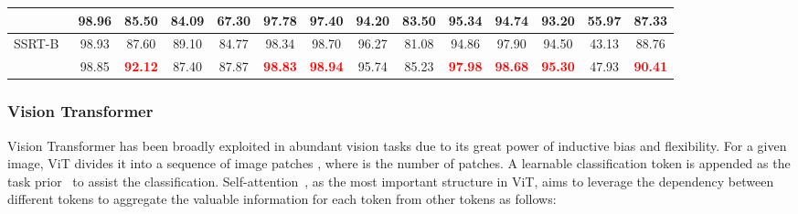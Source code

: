 \documentclass[journal]{IEEEtran}
\begin{document}
\begin{table*}[htp]
{\begin{tabular}{cccccccccccccc}
\rowcolor[gray]{0.9} \multicolumn{1}{c}{+Ours} & \multicolumn{1}{c}{98.96} & \multicolumn{1}{c}{85.50}                  & \multicolumn{1}{c}{84.09} & \multicolumn{1}{c}{67.30}                  & \multicolumn{1}{c}{97.78}                  & \multicolumn{1}{c}{97.40}                  & \multicolumn{1}{c}{94.20} & \multicolumn{1}{c}{83.50}                  & \multicolumn{1}{c}{95.34}                  & \multicolumn{1}{c}{94.74}                  & \multicolumn{1}{c}{93.20}                 & \multicolumn{1}{c}{55.97}                  & \multicolumn{1}{c}{87.33}                  \\ \hline







SSRT-B~\cite{sun2022safeSSRT}                              & 98.93                & 87.60                                 & 89.10                & 84.77                                 & 98.34                                 & 98.70                                 & 96.27                & 81.08                                 & 94.86                                 & 97.90                                 & 94.50                                & 43.13                                 & 88.76                                 \\
\rowcolor[gray]{0.9} \multicolumn{1}{c}{+Ours}     & 98.85       &  \textcolor{red}{\textbf{92.12}} & 87.40        &  87.87 &  \textcolor{red}{\textbf{98.83}} &  \textcolor{red}{\textbf{98.94}} & 95.74       & 85.23 &  \textcolor{red}{\textbf{97.98}} &  \textcolor{red}{\textbf{98.68}} &   \textcolor{red}{\textbf{95.30}} & 47.93 & \textcolor{red}{\textbf{90.41}} \\ \hline
\end{tabular}}
\label{tab:visda-2017}
\end{table*}
\subsubsection{Vision Transformer}
Vision Transformer has been broadly exploited in abundant vision tasks due to its great power of inductive bias and flexibility. For a given image, ViT divides it into a sequence of image patches , where  is the number of patches. A learnable classification token  is appended as the task prior~\cite{dosovitskiy2020imageViT} to assist the classification. Self-attention~\cite{vaswani2017attentionisallyouneed}, as the most important structure in ViT, aims to leverage the dependency between different tokens to aggregate the valuable information for each token from other tokens as follows:
\end{document}
